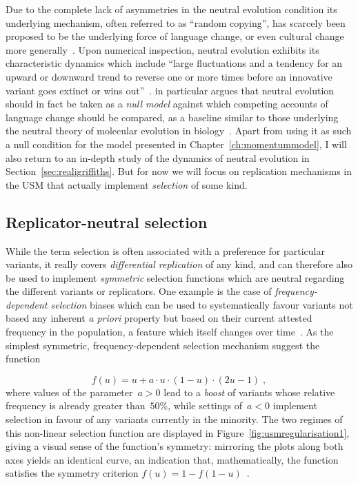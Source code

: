 Due to the complete lack of asymmetries in the neutral evolution condition its underlying mechanism, often referred to as ``random copying'', has scarcely been proposed to be the underlying force of language change, or even cultural change more generally~\citep{Mesoudi2009}.
Upon numerical inspection, neutral evolution exhibits its characteristic dynamics which include ``large fluctuations and a tendency for an upward or downward trend to reverse one or more times before an innovative variant goes extinct or wins out''~\citep[p.285]{Blythe2012}.
\citet{Blythe2012neutral} in particular argues that neutral evolution should in fact be taken as a \emph{null model} against which competing accounts of language change should be compared, as a baseline similar to those underlying the neutral theory of molecular evolution in biology~\citep{Kimura1983}. Apart from using it as such a null condition for the model presented in Chapter~\ref{ch:momentummodel}, I will also return to an in-depth study of the dynamics of neutral evolution in Section~\ref{sec:realigriffiths}. But for now we will focus on replication mechanisms in the USM that actually implement \emph{selection} of some kind.

\subsection{Replicator-neutral selection}\label{sec:usmregularisation}
While the term selection is often associated with a preference for particular variants, it really covers \emph{differential replication} of any kind, and can therefore also be used to implement \emph{symmetric} selection functions which are neutral regarding the different variants or replicators. One example is the case of \emph{frequency-dependent selection} biases which can be used to systematically favour variants not based any inherent \emph{a priori} property but based on their current attested frequency in the population, a feature which itself changes over time~\citep{Boyd1985}. As the simplest symmetric, frequency-dependent selection mechanism \citet{Blythe2012} suggest the function

\begin{equation}\label{eq:usmregularisation}
f(u) = u + a\cdot u\cdot (1-u)\cdot(2u-1)\;,
\end{equation}
where values of the parameter~$a>0$ lead to a \emph{boost} of variants whose relative frequency is already greater than~$50\%$, while settings of~$a<0$ implement selection in favour of any variants currently in the minority.
The two regimes of this non-linear selection function are displayed in Figure~\ref{fig:usmregularisation1}, giving a visual sense of the function's symmetry: mirroring the plots along both axes yields an identical curve, an indication that, mathematically, the function satisfies the symmetry criterion $f(u) = 1 - f(1-u)$~\citep{Blythe2012}.


